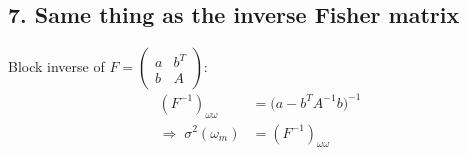 \documentclass[11pt]{article}
\begin{document}
\subsection*{7. Same thing as the inverse Fisher matrix}
Block inverse of $F=\begin{pmatrix} a & b^{T}\\ b & A\end{pmatrix}$:
\begin{align}
(F^{-1})_{\omega\omega} &= \big(a - b^{T}A^{-1}b\big)^{-1} \\
\Rightarrow\; \sigma^2(\omega_m) &= (F^{-1})_{\omega\omega}
\end{align}
\end{document}
